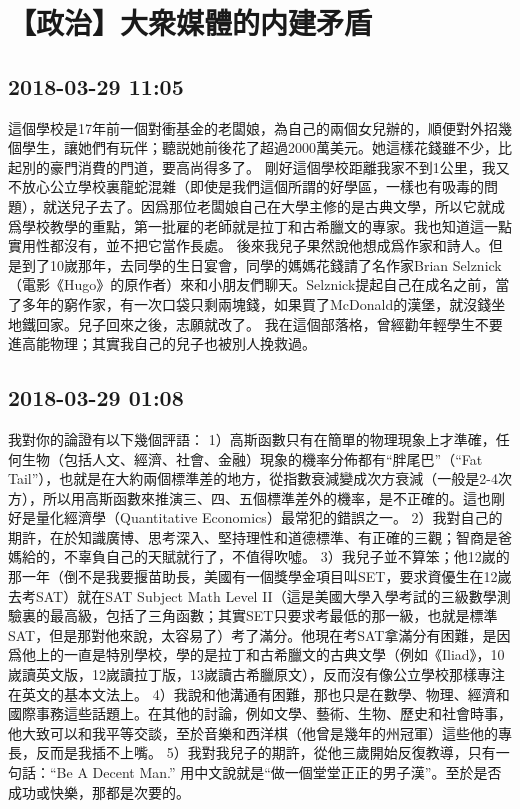 \documentclass[twocolumn]{ctexart}
\begin{document}
\section*{【政治】大衆媒體的内建矛盾}
\subsection*{2018-03-29 11:05}

這個學校是17年前一個對衝基金的老闆娘，為自己的兩個女兒辦的，順便對外招幾個學生，讓她們有玩伴；聽説她前後花了超過2000萬美元。她這樣花錢雖不少，比起別的豪門消費的門道，要高尚得多了。 
剛好這個學校距離我家不到1公里，我又不放心公立學校裏龍蛇混雜（即使是我們這個所謂的好學區，一樣也有吸毒的問題），就送兒子去了。因爲那位老闆娘自己在大學主修的是古典文學，所以它就成爲學校教學的重點，第一批雇的老師就是拉丁和古希臘文的專家。我也知道這一點實用性都沒有，並不把它當作長處。 
後來我兒子果然說他想成爲作家和詩人。但是到了10嵗那年，去同學的生日宴會，同學的媽媽花錢請了名作家Brian Selznick（電影《Hugo》的原作者）來和小朋友們聊天。Selznick提起自己在成名之前，當了多年的窮作家，有一次口袋只剩兩塊錢，如果買了McDonald的漢堡，就沒錢坐地鐵回家。兒子回來之後，志願就改了。 
我在這個部落格，曾經勸年輕學生不要進高能物理；其實我自己的兒子也被別人挽救過。
\subsection*{2018-03-29 01:08}

我對你的論證有以下幾個評語： 
1）高斯函數只有在簡單的物理現象上才準確，任何生物（包括人文、經濟、社會、金融）現象的機率分佈都有“胖尾巴”（“Fat Tail”），也就是在大約兩個標準差的地方，從指數衰減變成次方衰減（一般是2-4次方），所以用高斯函數來推演三、四、五個標準差外的機率，是不正確的。這也剛好是量化經濟學（Quantitative Economics）最常犯的錯誤之一。 
2）我對自己的期許，在於知識廣博、思考深入、堅持理性和道德標準、有正確的三觀；智商是爸媽給的，不辜負自己的天賦就行了，不值得吹噓。 
3）我兒子並不算笨；他12嵗的那一年（倒不是我要揠苗助長，美國有一個獎學金項目叫SET，要求資優生在12嵗去考SAT）就在SAT Subject Math Level II（這是美國大學入學考試的三級數學測驗裏的最高級，包括了三角函數；其實SET只要求考最低的那一級，也就是標準SAT，但是那對他來說，太容易了）考了滿分。他現在考SAT拿滿分有困難，是因爲他上的一直是特別學校，學的是拉丁和古希臘文的古典文學（例如《Iliad》，10嵗讀英文版，12嵗讀拉丁版，13嵗讀古希臘原文），反而沒有像公立學校那樣專注在英文的基本文法上。 
4）我說和他溝通有困難，那也只是在數學、物理、經濟和國際事務這些話題上。在其他的討論，例如文學、藝術、生物、歷史和社會時事，他大致可以和我平等交談，至於音樂和西洋棋（他曾是幾年的州冠軍）這些他的專長，反而是我插不上嘴。 
5）我對我兒子的期許，從他三歲開始反復教導，只有一句話：“Be A Decent Man.” 用中文說就是“做一個堂堂正正的男子漢”。至於是否成功或快樂，那都是次要的。
\end{document}
